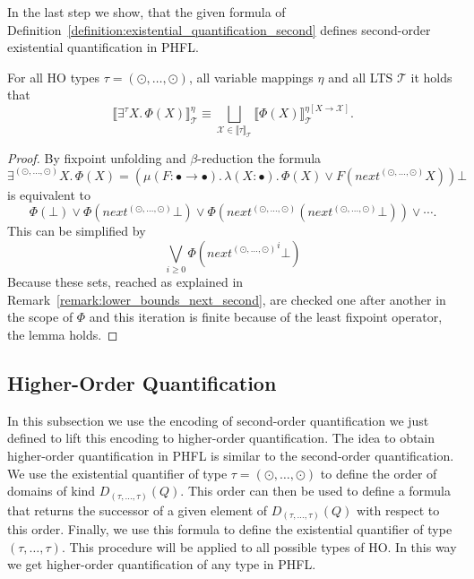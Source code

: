 In the last step we show, that the given formula of Definition~\ref{definition:existential_quantification_second} defines
second-order existential quantification in PHFL.

\begin{lemma}
    \label{lemma:existential_quantifier_second}
    For all HO types $\tau = (\odot, \dots, \odot)$, all variable mappings $\eta$ and all LTS $\mathcal{T}$ it holds that
    \[\llbracket \exists^\tau X.\,\Phi(X)\rrbracket^\eta_\mathcal{T} \equiv \underset{\mathcal{X} \in \llbracket \tau
    \rrbracket_\mathcal{T}}{\bigsqcup} \llbracket \Phi(X) \rrbracket^{\eta[X\rightarrow \mathcal{X}]}_\mathcal{T}.\]
\end{lemma}

\begin{proof}
    By fixpoint unfolding and $\beta$-reduction the formula 
    \[\exists^{(\odot, \dots, \odot)}X.\, \Phi(X) = (\mu (F \colon \bullet \rightarrow \bullet).\, \lambda (X
    \colon \bullet).\, \Phi(X) \vee F(next^{(\odot, \dots, \odot)} X)) \bot\] is equivalent to 
    \[\Phi(\bot) \vee \Phi(next^{(\odot, \dots, \odot)}\bot) \vee \Phi(next^{(\odot, \dots, \odot)} (next^{(\odot, \dots, \odot)} \bot)) \vee \dotsb. \]
    This can be simplified by
    \[\underset{i\geq0}{\bigvee} \Phi({next^{(\odot, \dots, \odot)}}^i \bot)\]
	Because these sets, reached as explained in Remark~\ref{remark:lower_bounds_next_second}, are checked one after another in the scope of $\Phi$ and this iteration is finite 
	because of the least fixpoint operator, the lemma holds.
\end{proof}

\subsection{Higher-Order Quantification}\label{subsec:higher-orderQuantification}

In this subsection we use the encoding of second-order quantification  we just defined to lift this encoding to higher-order
quantification. The idea to obtain higher-order quantification in PHFL is similar to the second-order quantification.
We use the existential quantifier of type $\tau = (\odot, \dots, \odot)$ to define the order of domains of kind
$D_{(\tau, \dots, \tau)}(Q)$. This order can then be used to define a formula that returns the successor
of a given element of $D_{(\tau, \dots, \tau)}(Q)$ with respect to this order. Finally, we use this
formula to define the existential quantifier of type $(\tau, \dots, \tau)$. This procedure will be applied to all
possible types of HO. In this way we get higher-order quantification of any type in PHFL.

